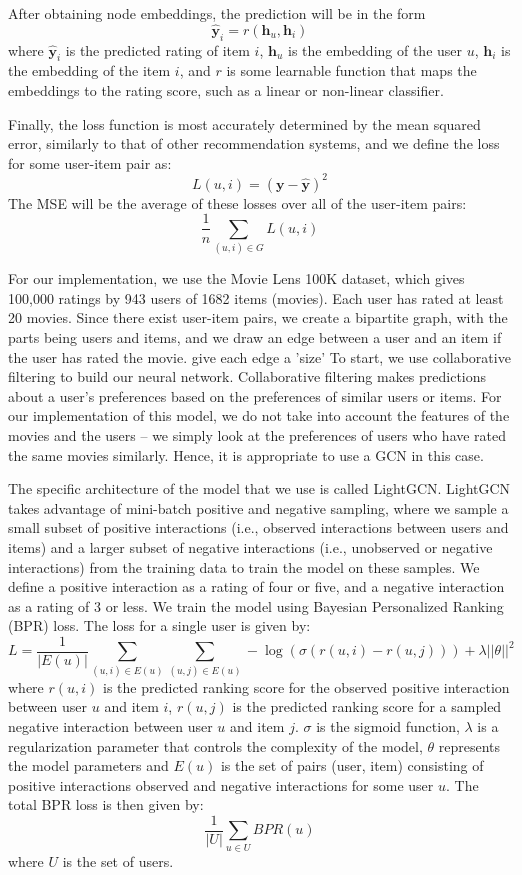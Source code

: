 \documentclass[final]{article}
\begin{document}
After obtaining node embeddings, the prediction will be in the form 
$$\hat{\textbf{y}}_i = r(\textbf{h}_u, \textbf{h}_i)$$
where $\hat{\textbf{y}}_i$ is the predicted rating of item $i$, $\textbf{h}_u$ is the embedding of the user $u$, $\textbf{h}_i$ is the embedding of the item $i$, and $r$ is some learnable function that maps the embeddings to the rating score, such as a linear or non-linear classifier.

Finally, the loss function is most accurately determined by the mean squared error, similarly to that of other recommendation systems, and we define the loss for some user-item pair as: 
$$L(u,i) = (\textbf{y} - \hat{\textbf{y}})^2$$
The MSE will be the average of these losses over all of the user-item pairs: 
$$\frac{1}{n} \sum_{(u, i) \in G} L(u, i)$$

For our implementation, we use the Movie Lens 100K dataset, which gives 100,000 ratings by 943 users of 1682 items (movies). Each user has rated at least 20 movies. Since there exist user-item pairs, we create a bipartite graph, with the parts being users and items, and we draw an edge between a user and an item if the user has rated the movie. \cite{movielens_dataset} give each edge a 'size'  To start, we use collaborative filtering to build our neural network. Collaborative filtering makes predictions about a user's preferences based on the preferences of similar users or items. For our implementation of this model, we do not take into account the features of the movies and the users -- we simply look at the preferences of users who have rated the same movies similarly. Hence, it is appropriate to use a GCN in this case. 

The specific architecture of the model that we use is called LightGCN. LightGCN takes advantage of mini-batch positive and negative sampling, where we sample a small subset of positive interactions (i.e., observed interactions between users and items) and a larger subset of negative interactions (i.e., unobserved or negative interactions) from the training data to train the model on these samples. We define a positive interaction as a rating of four or five, and a negative interaction as a rating of 3 or less. We train the model using Bayesian Personalized Ranking (BPR) loss. The loss for a single user is given by: 
$$L = \frac{1}{|E(u)|} \sum_{(u, i) \in E(u)}\sum_{(u, j) \in E(u)} -\log(\sigma(r(u, i) - r(u, j))) + \lambda||\theta||^2$$
where $r(u, i)$ is the predicted ranking score for the observed positive interaction between user $u$ and item $i$, 
$r(u, j)$ is the predicted ranking score for a sampled negative interaction between user $u$ and item $j$. $\sigma$ is the sigmoid function, $\lambda$ is a regularization parameter that controls the complexity of the model, $\theta$ represents the model parameters and $E(u)$ is the set of pairs (user, item) consisting of positive interactions observed and negative interactions for some user $u$. The total BPR loss is then given by: 
$$\frac{1}{|U|}\sum_{u \in U}BPR(u)$$
where $U$ is the set of users. 
\end{document}
